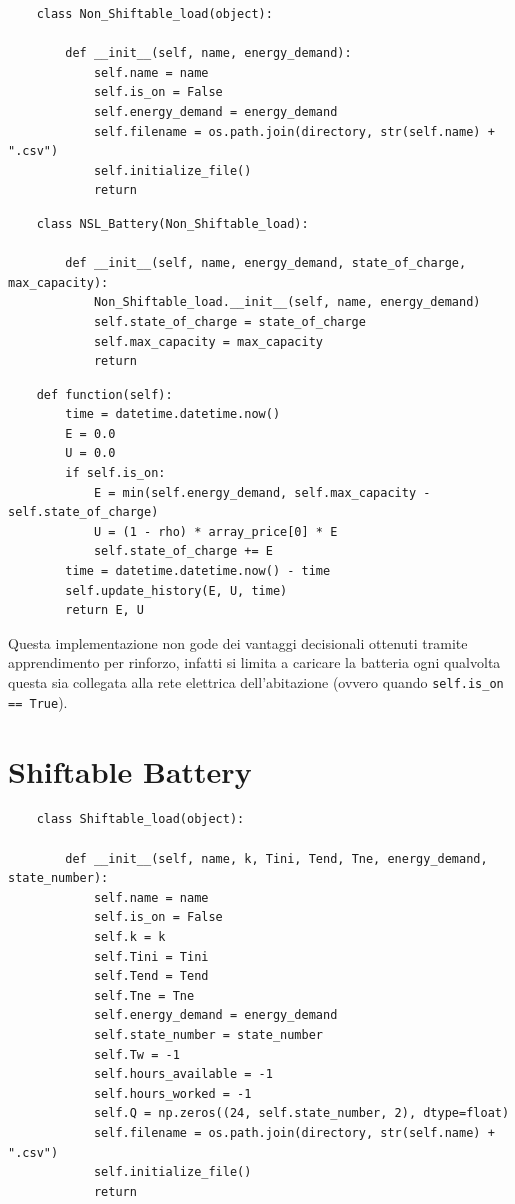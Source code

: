 \documentclass[italian, Lau, oneside]{sapthesis}
\begin{document}
\begin{verbatim}
    class Non_Shiftable_load(object):
    
        def __init__(self, name, energy_demand):
            self.name = name
            self.is_on = False
            self.energy_demand = energy_demand
            self.filename = os.path.join(directory, str(self.name) + ".csv")
            self.initialize_file()
            return
\end{verbatim}
\begin{verbatim}
    class NSL_Battery(Non_Shiftable_load):
    
        def __init__(self, name, energy_demand, state_of_charge, max_capacity):
            Non_Shiftable_load.__init__(self, name, energy_demand)
            self.state_of_charge = state_of_charge
            self.max_capacity = max_capacity
            return
\end{verbatim}
\begin{verbatim}
    def function(self):
        time = datetime.datetime.now()
        E = 0.0
        U = 0.0
        if self.is_on:
            E = min(self.energy_demand, self.max_capacity - self.state_of_charge)
            U = (1 - rho) * array_price[0] * E
            self.state_of_charge += E
        time = datetime.datetime.now() - time
        self.update_history(E, U, time)
        return E, U
\end{verbatim}
Questa implementazione non gode dei vantaggi decisionali ottenuti tramite apprendimento per rinforzo, infatti si limita a caricare la batteria ogni qualvolta questa sia collegata alla rete elettrica dell'abitazione (ovvero quando \texttt{self.is\_on == True}).
\section{Shiftable Battery}
\begin{verbatim}
    class Shiftable_load(object):
    
        def __init__(self, name, k, Tini, Tend, Tne, energy_demand, state_number):
            self.name = name
            self.is_on = False
            self.k = k
            self.Tini = Tini
            self.Tend = Tend 
            self.Tne = Tne 
            self.energy_demand = energy_demand
            self.state_number = state_number
            self.Tw = -1 
            self.hours_available = -1 
            self.hours_worked = -1 
            self.Q = np.zeros((24, self.state_number, 2), dtype=float)
            self.filename = os.path.join(directory, str(self.name) + ".csv")
            self.initialize_file()
            return
\end{verbatim}
\end{document}
